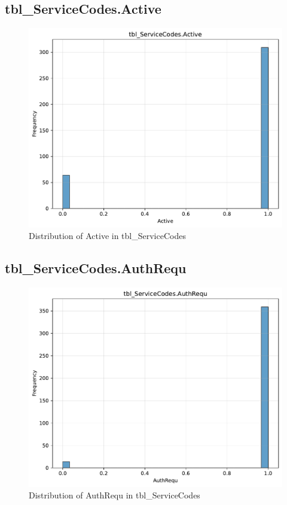 \subsection{tbl\_ServiceCodes.Active}

\begin{figure}[htbp]
\centering
\includegraphics[width=\textwidth]{figures/dbo_tbl_ServiceCodes_Active.pdf}
\caption{Distribution of Active in tbl\_ServiceCodes}
\end{figure}\newpage

\subsection{tbl\_ServiceCodes.AuthRequ}

\begin{figure}[htbp]
\centering
\includegraphics[width=\textwidth]{figures/dbo_tbl_ServiceCodes_AuthRequ.pdf}
\caption{Distribution of AuthRequ in tbl\_ServiceCodes}
\end{figure}\newpage

